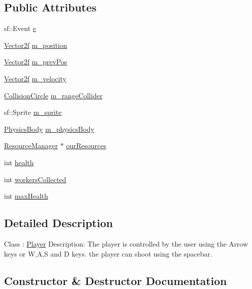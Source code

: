 \subsection*{Public Attributes}
\begin{DoxyCompactItemize}
\item 
sf\+::\+Event \mbox{\hyperlink{class_player_ae78c3b0c8074de09d30bbafa899c6c47}{e}}
\item 
\mbox{\hyperlink{class_vector2f}{Vector2f}} \mbox{\hyperlink{class_player_a84084a5e97891280d56c093264e62720}{m\+\_\+position}}
\item 
\mbox{\hyperlink{class_vector2f}{Vector2f}} \mbox{\hyperlink{class_player_a3d5f4aa30da7571cc93beef07c364539}{m\+\_\+prev\+Pos}}
\item 
\mbox{\hyperlink{class_vector2f}{Vector2f}} \mbox{\hyperlink{class_player_a770194ea3e16274ea08fbcbc6d47e76f}{m\+\_\+velocity}}
\item 
\mbox{\hyperlink{class_collision_circle}{Collision\+Circle}} \mbox{\hyperlink{class_player_ae12b339db716d6dcf1f5e4400c28c532}{m\+\_\+range\+Collider}}
\item 
sf\+::\+Sprite \mbox{\hyperlink{class_player_acea3e1bbd92be7a0fbf26764ec919b24}{m\+\_\+sprite}}
\item 
\mbox{\hyperlink{class_physics_body}{Physics\+Body}} \mbox{\hyperlink{class_player_a5f3088b84a4ba515a053122b9539ab24}{m\+\_\+physics\+Body}}
\item 
\mbox{\hyperlink{class_resource_manager}{Resource\+Manager}} $\ast$ \mbox{\hyperlink{class_player_ac84e59bad7aa8bf5d9146d1e6b0e8b60}{our\+Resources}}
\item 
int \mbox{\hyperlink{class_player_aad33b52bfe73c4c978a3135172f286a0}{health}}
\item 
int \mbox{\hyperlink{class_player_a5be44b48759fcff995237e50ebbcd4be}{workers\+Collected}}
\item 
int \mbox{\hyperlink{class_player_a2196f0d382a1d97c739a036781b2316b}{max\+Health}}
\end{DoxyCompactItemize}


\subsection{Detailed Description}
Class \+: \mbox{\hyperlink{class_player}{Player}} Description\+: The player is controlled by the user using the Arrow keys or W,A,S and D keys. the player can shoot using the spacebar. 

\subsection{Constructor \& Destructor Documentation}
\mbox{\label{class_player_a4c481b6493f9e0d550377c0d99763c82}} 
